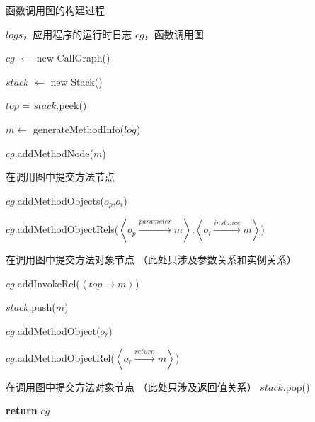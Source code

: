 



\begin{algorithm*}[!ht]
	\caption{函数调用图的构建过程} 
	\label{alg:buildCG}
\begin{algorithmic}[1]
		
	 \small
	\REQUIRE  $logs$，应用程序的运行时日志
	\ENSURE $cg$，函数调用图
	
	
	\STATE 	$cg$ $\gets$ new CallGraph()
	
		\STATE 	$stack$ $\gets$ new Stack()
		
				\STATE 	$top$ = $stack$.peek()                 
			
			
			
					\STATE 	$m \gets $ generateMethodInfo($log$)
					
					\STATE  $cg$.addMethodNode($m$)
					
					
					\Comment 在调用图中提交方法节点 
									
					\STATE 	$cg$.addMethodObjects($ o_p $,$o_i $) 								
					
					\STATE 	$cg$.addMethodObjectRels($ \left\langle  o_p \stackrel{parameter}{\longrightarrow}   m \right\rangle   $,$ \left\langle  o_i \stackrel{instance}{\longrightarrow}   m \right\rangle  $) 
					
					\Comment 在调用图中提交方法对象节点 （此处只涉及参数关系和实例关系）
					

							\STATE 	$cg$.addInvokeRel($ \left\langle  top \to  m \right\rangle  $) 
							
							\STATE 	$stack$.push($m$)
					\ENDIF
	
			\ELSE 
	
					\STATE 	$cg$.addMethodObject($  o_r  $) 
					
					\STATE 	$cg$.addMethodObjectRel($ \left\langle   o_r \stackrel{return}{\longrightarrow}   m \right\rangle  $) 
					
					
					\Comment 在调用图中提交方法对象节点 （此处只涉及返回值关系）
					\STATE 		$stack$.pop() 

			\ENDIF

		\ENDFOR
	
	
	\ENDFOR
	
 \STATE \textbf{return}   $cg$
	

\end{algorithmic}
\end{algorithm*}

